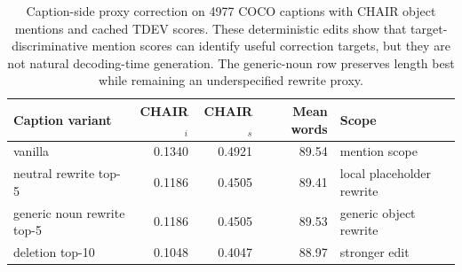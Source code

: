 \begin{table}[t]
\centering
\small
\setlength{\tabcolsep}{4.0pt}
\begin{tabular}{lrrrl}
\toprule
Caption variant & CHAIR$_i$ & CHAIR$_s$ & Mean words & Scope \\
\midrule
vanilla & 0.1340 & 0.4921 & 89.54 & mention scope \\
neutral rewrite top-5 & 0.1186 & 0.4505 & 89.41 & local placeholder rewrite \\
generic noun rewrite top-5 & 0.1186 & 0.4505 & 89.53 & generic object rewrite \\
deletion top-10 & 0.1048 & 0.4047 & 88.97 & stronger edit \\
\bottomrule
\end{tabular}
\caption{Caption-side proxy correction on 4977 COCO captions with CHAIR object mentions and cached TDEV scores. These deterministic edits show that target-discriminative mention scores can identify useful correction targets, but they are not natural decoding-time generation. The generic-noun row preserves length best while remaining an underspecified rewrite proxy.}
\label{tab:appendix-caption-proxy}
\end{table}
